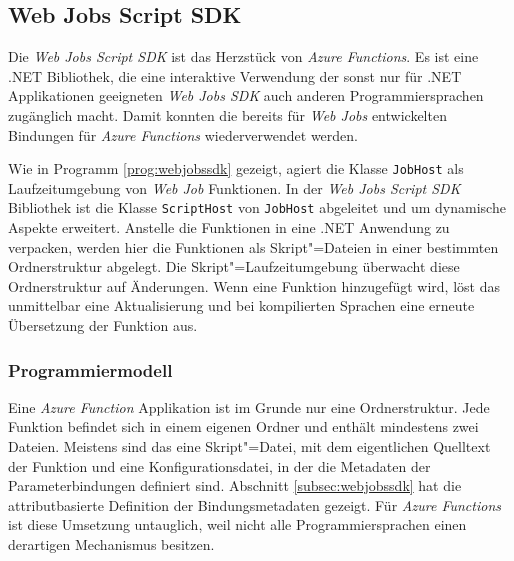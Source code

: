 \subsection{Web Jobs Script SDK}
\label{subsec:webjobsscriptsdk}

Die \textit{Web Jobs Script SDK} ist das Herzstück von \textit{Azure Functions}. Es ist eine .NET Bibliothek, die eine interaktive Verwendung der sonst nur für .NET Applikationen geeigneten \textit{Web Jobs SDK} auch anderen Programmiersprachen zugänglich macht. Damit konnten die bereits für \textit{Web Jobs} entwickelten Bindungen für \textit{Azure Functions} wiederverwendet werden.

Wie in Programm \ref{prog:webjobssdk} gezeigt, agiert die Klasse \lstinline{JobHost} als Laufzeitumgebung von \textit{Web Job} Funktionen. In der \textit{Web Jobs Script SDK} Bibliothek ist die Klasse \lstinline{ScriptHost} von \lstinline{JobHost} abgeleitet und um dynamische Aspekte erweitert. Anstelle die Funktionen in eine .NET Anwendung zu verpacken, werden hier die Funktionen als Skript"=Dateien in einer bestimmten Ordnerstruktur abgelegt. Die Skript"=Laufzeitumgebung überwacht diese Ordnerstruktur auf Änderungen. Wenn eine Funktion hinzugefügt wird, löst das unmittelbar eine Aktualisierung und bei kompilierten Sprachen eine erneute Übersetzung der Funktion aus.

\subsubsection{Programmiermodell}

Eine \textit{Azure Function} Applikation ist im Grunde nur eine Ordnerstruktur. Jede Funktion befindet sich in einem eigenen Ordner und enthält mindestens zwei Dateien. Meistens sind das eine Skript"=Datei, mit dem eigentlichen Quelltext der Funktion und eine Konfigurationsdatei, in der die Metadaten der Parameterbindungen definiert sind. Abschnitt \ref{subsec:webjobssdk} hat die attributbasierte Definition der Bindungsmetadaten gezeigt. Für \textit{Azure Functions} ist diese Umsetzung untauglich, weil nicht alle Programmiersprachen einen derartigen Mechanismus besitzen.

